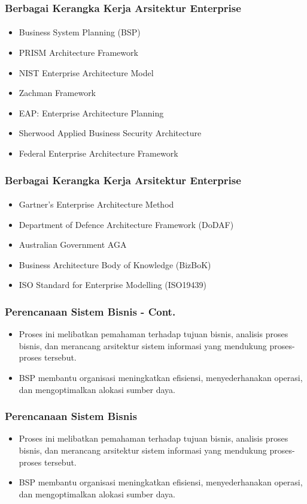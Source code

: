 \documentclass[aspectratio=169, table]{beamer}
\begin{document}
	\begin{frame}
		\frametitle{Berbagai Kerangka Kerja Arsitektur Enterprise}
        \framesubtitle{\hspace{1cm}}
		\begin{itemize}
			\item Business System Planning (BSP)
			\item PRISM Architecture Framework
			\item NIST Enterprise Architecture Model
			\item Zachman Framework
			\item EAP: Enterprise Architecture Planning
			\item Sherwood Applied Business Security Architecture
			\item Federal Enterprise Architecture Framework

		\end{itemize}

	\end{frame}
		\begin{frame}
		\frametitle{Berbagai Kerangka Kerja Arsitektur Enterprise}
        \framesubtitle{\hspace{1cm}}
		\begin{itemize}
			\item Gartner’s Enterprise Architecture Method
			\item Department of Defence Architecture Framework (DoDAF)
			\item Australian Government AGA
			\item Business Architecture Body of Knowledge (BizBoK)
			\item ISO Standard for Enterprise Modelling (ISO19439)
		\end{itemize}
	\end{frame}

	\begin{frame}
		\frametitle{Perencanaan Sistem Bisnis - Cont.}
		\begin{itemize}
			\item Proses ini melibatkan pemahaman terhadap tujuan bisnis, analisis proses bisnis, dan merancang arsitektur sistem informasi yang mendukung proses-proses tersebut.
			\item BSP membantu organisasi meningkatkan efisiensi, menyederhanakan operasi, dan mengoptimalkan alokasi sumber daya.
		\end{itemize}
	\end{frame}


	\begin{frame}
		\frametitle{Perencanaan Sistem Bisnis}
		\begin{itemize}
			\item Proses ini melibatkan pemahaman terhadap tujuan bisnis, analisis proses bisnis, dan merancang arsitektur sistem informasi yang mendukung proses-proses tersebut.
			\item BSP membantu organisasi meningkatkan efisiensi, menyederhanakan operasi, dan mengoptimalkan alokasi sumber daya.
		\end{itemize}
	\end{frame}
\end{document}
